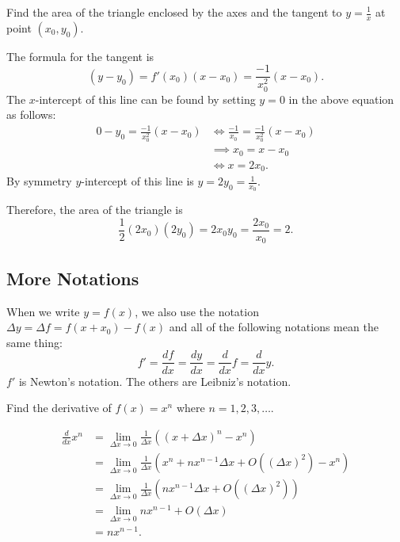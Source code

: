 \begin{example}
Find the area of the triangle enclosed by the axes and the tangent to \(
y = \frac{1}{x} \) at point \( (x_0, y_0) \).
\end{example}
\begin{solution}
The formula for the tangent is
\[
    (y - y_0) = f'(x_0) (x - x_0) = \frac{-1}{x_0^2} (x - x_0).
\]
The \( x \)-intercept of this line can be found by setting \( y = 0 \)
in the above equation as follows:
\begin{align*}
    0 - y_0 = \frac{-1}{x_0^2} (x - x_0)
        & \iff \frac{-1}{x_0} = \frac{-1}{x_0^2} (x - x_0) \\
        & \implies x_0 = x - x_0 \\
        & \iff x = 2x_0.
\end{align*}
By symmetry \( y \)-intercept of this line is \( y = 2y_0 =
\frac{1}{x_0} \).

Therefore, the area of the triangle is
\[
    \frac{1}{2} (2x_0) (2y_0) = 2x_0 y_0 = \frac{2x_0}{x_0} = 2.
\]
\end{solution}

\subsection{More Notations}
When we write \( y = f(x) \), we also use the notation \( \Delta y =
\Delta f = f(x + x_0) - f(x) \) and all of the following notations mean
the same thing:
\[
    f' = \frac{df}{dx} = \frac{dy}{dx} = \frac{d}{dx} f = \frac{d}{dx} y.
\]
\( f' \) is Newton's notation. The others are Leibniz's notation.

\begin{example}
Find the derivative of \( f(x) = x^n \) where \( n = 1, 2, 3, \dots \).
\end{example}
\begin{solution}
\begin{align*}
\frac{d}{dx} x^n
    & = \lim_{\Delta x \to 0} \frac{1}{\Delta x}
        \left( (x + \Delta x)^n - x^n \right) \\
    & = \lim_{\Delta x \to 0} \frac{1}{\Delta x}
        \left( x^n + nx^{n - 1} \Delta x + O(\left(\Delta x\right)^2) -
               x^n \right) \\
    & = \lim_{\Delta x \to 0} \frac{1}{\Delta x}
        \left( nx^{n - 1} \Delta x + O(\left(\Delta x\right)^2) \right) \\
    & = \lim_{\Delta x \to 0} nx^{n - 1} + O(\Delta x) \\
    & = nx^{n - 1}.
\end{align*}
\end{solution}
